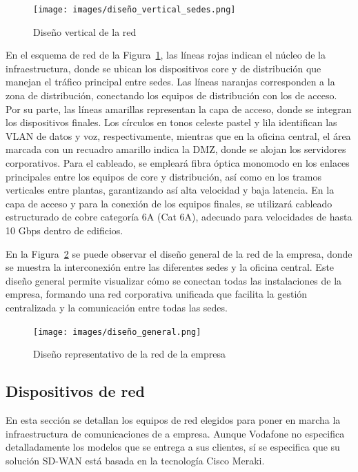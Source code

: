 \begin{figure}[H]
	\centering
	\texttt{[image: images/diseño\_vertical\_sedes.png]}
	\caption{Diseño vertical de la red}
	\label{fig:diseño_vertical_red}
\end{figure}

En el esquema de red de la Figura~\ref{fig:diseño_vertical_red}, las líneas rojas indican el núcleo de la infraestructura, donde se ubican los dispositivos core y de distribución que manejan el tráfico principal entre sedes. Las líneas naranjas corresponden a la zona de distribución, conectando los equipos de distribución con los de acceso. Por su parte, las líneas amarillas representan la capa de acceso, donde se integran los dispositivos finales. Los círculos en tonos celeste pastel y lila identifican las VLAN de datos y voz, respectivamente, mientras que en la oficina central, el área marcada con un recuadro amarillo indica la DMZ, donde se alojan los servidores corporativos. Para el cableado, se empleará fibra óptica monomodo en los enlaces principales entre los equipos de core y distribución, así como en los tramos verticales entre plantas, garantizando así alta velocidad y baja latencia. En la capa de acceso y para la conexión de los equipos finales, se utilizará cableado estructurado de cobre categoría 6A (Cat 6A), adecuado para velocidades de hasta 10 Gbps dentro de edificios.

\vspace{0.5cm}
En la Figura~\ref{fig:diseño_general} se puede observar el diseño general de la red de la empresa, donde se muestra la interconexión entre las diferentes sedes y la oficina central. Este diseño general permite visualizar cómo se conectan todas las instalaciones de la empresa, formando una red corporativa unificada que facilita la gestión centralizada y la comunicación entre todas las sedes.

\begin{figure}[htb]
	\centering
	\texttt{[image: images/diseño\_general.png]}
	\caption{Diseño representativo de la red de la empresa}
	\label{fig:diseño_general}
\end{figure}

\subsection{Dispositivos de red}
\label{subsubsec:dispositivos_red}
En esta sección se detallan los equipos de red elegidos para poner en marcha la infraestructura de comunicaciones de
a empresa. Aunque Vodafone no especifica detalladamente los modelos que se entrega a sus clientes, sí se especifica que su solución SD-WAN está basada en la tecnología Cisco Meraki.

